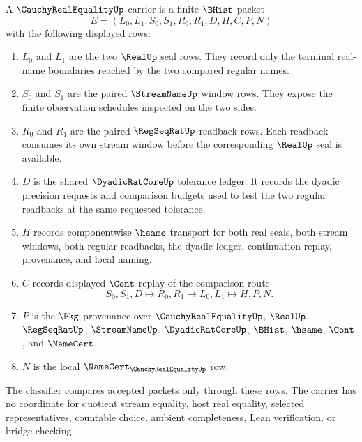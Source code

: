 \begin{definition}
\label{def:cauchy-real-equality-carrier}
A $\CauchyRealEqualityUp$ carrier is a finite $\BHist$ packet
$$
E=(L_0,L_1,S_0,S_1,R_0,R_1,D,H,C,P,N)
$$
with the following displayed rows:
\begin{enumerate}
\item $L_0$ and $L_1$ are the two $\RealUp$ seal rows. They record only the terminal real-name boundaries reached by the two compared regular names.
\item $S_0$ and $S_1$ are the paired $\StreamNameUp$ window rows. They expose the finite observation schedules inspected on the two sides.
\item $R_0$ and $R_1$ are the paired $\RegSeqRatUp$ readback rows. Each readback consumes its own stream window before the corresponding $\RealUp$ seal is available.
\item $D$ is the shared $\DyadicRatCoreUp$ tolerance ledger. It records the dyadic precision requests and comparison budgets used to test the two regular readbacks at the same requested tolerance.
\item $H$ records componentwise $\hsame$ transport for both real seals, both stream windows, both regular readbacks, the dyadic ledger, continuation replay, provenance, and local naming.
\item $C$ records displayed $\Cont$ replay of the comparison route
$$
S_0,S_1,D \longmapsto R_0,R_1 \longmapsto L_0,L_1 \longmapsto H,P,N .
$$
\item $P$ is the $\Pkg$ provenance over $\CauchyRealEqualityUp$, $\RealUp$, $\RegSeqRatUp$, $\StreamNameUp$, $\DyadicRatCoreUp$, $\BHist$, $\hsame$, $\Cont$, and $\NameCert$.
\item $N$ is the local $\NameCert_{\CauchyRealEqualityUp}$ row.
\end{enumerate}
The classifier compares accepted packets only through these rows. The carrier has no coordinate for quotient stream equality, host real equality, selected representatives, countable choice, ambient completeness, Lean verification, or bridge checking.
\end{definition}

